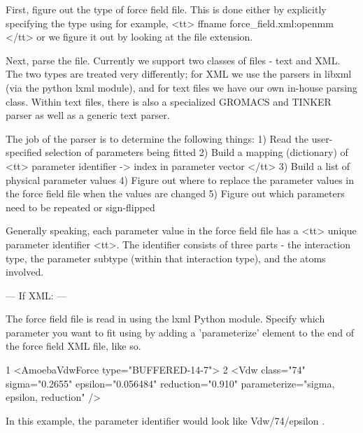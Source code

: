 \begin{DoxyVerb}     First, figure out the type of force field file.  This is done
     either by explicitly specifying the type using for example,
     <tt> ffname force_field.xml:openmm </tt> or we figure it out
     by looking at the file extension.

     Next, parse the file.  Currently we support two classes of
     files - text and XML.  The two types are treated very
     differently; for XML we use the parsers in libxml (via the
     python lxml module), and for text files we have our own
     in-house parsing class.  Within text files, there is also a
     specialized GROMACS and TINKER parser as well as a generic
     text parser.

     The job of the parser is to determine the following things:
     1) Read the user-specified selection of parameters being fitted
     2) Build a mapping (dictionary) of <tt> parameter identifier -> index in parameter vector </tt>
     3) Build a list of physical parameter values
     4) Figure out where to replace the parameter values in the force field file when the values are changed
     5) Figure out which parameters need to be repeated or sign-flipped

     Generally speaking, each parameter value in the force field
     file has a <tt> unique parameter identifier <tt>.  The
     identifier consists of three parts - the interaction type, the
     parameter subtype (within that interaction type), and the
     atoms involved.

     --- If XML: ---

     The force field file is read in using the lxml Python module.  Specify
     which parameter you want to fit using by adding a 'parameterize' element
     to the end of the force field XML file, like so.
\end{DoxyVerb}



\begin{DoxyCode}
1 <AmoebaVdwForce type=\textcolor{stringliteral}{"BUFFERED-14-7"}>
2    <Vdw \textcolor{keyword}{class}=\textcolor{stringliteral}{"74"} sigma=\textcolor{stringliteral}{"0.2655"} epsilon=\textcolor{stringliteral}{"0.056484"} reduction=\textcolor{stringliteral}{"0.910"} parameterize=\textcolor{stringliteral}{"sigma, epsilon,
       reduction"} /> 
\end{DoxyCode}


In this example, the parameter identifier would look like {\ttfamily  Vdw/74/epsilon }.


